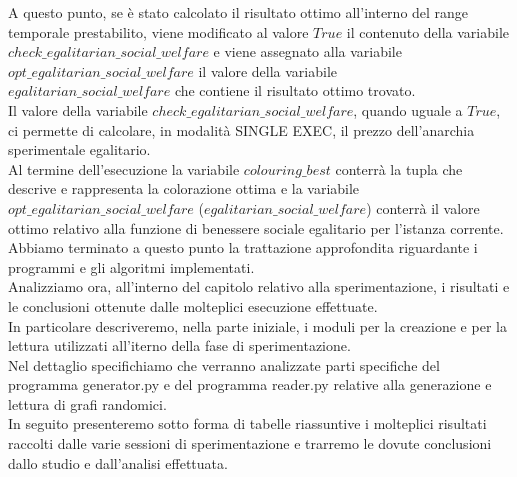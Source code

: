 A questo punto, se è stato calcolato il risultato ottimo all'interno del range temporale prestabilito, viene modificato al valore $True$ il contenuto della variabile $check\_egalitarian\_social\_welfare$ e viene assegnato alla variabile $opt\_egalitarian\_social\_welfare$ il valore della variabile \\
$egalitarian\_social\_welfare$ che contiene il risultato ottimo trovato.\\

Il valore della variabile $check\_egalitarian\_social\_welfare$, quando uguale a $True$, ci permette di calcolare, in modalità SINGLE EXEC, il prezzo dell'anarchia sperimentale egalitario.\\

Al termine dell'esecuzione la variabile $colouring\_best$ conterrà la tupla che descrive e rappresenta la colorazione ottima e la variabile \\
$opt\_egalitarian\_social\_welfare$ ($egalitarian\_social\_welfare$) conterrà il valore ottimo relativo alla funzione di benessere sociale egalitario per l'istanza corrente.\\

Abbiamo terminato a questo punto la trattazione approfondita riguardante i programmi e gli algoritmi implementati.\\
Analizziamo ora, all'interno del capitolo relativo alla sperimentazione, i risultati e le conclusioni ottenute dalle molteplici esecuzione effettuate.\\
In particolare descriveremo, nella parte iniziale, i moduli per la creazione e per la lettura utilizzati all'iterno della fase di sperimentazione.\\
Nel dettaglio specifichiamo che verranno analizzate parti specifiche del programma generator.py e del programma reader.py relative alla generazione e lettura di grafi randomici.\\
In seguito presenteremo sotto forma di tabelle riassuntive i molteplici risultati raccolti dalle varie sessioni di sperimentazione e trarremo le dovute conclusioni dallo studio e dall'analisi effettuata.\\